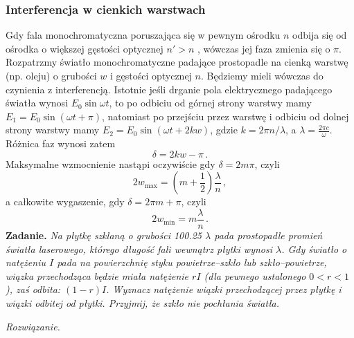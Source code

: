 \documentclass[../main.tex]{subfiles}
\begin{document}
\subsubsection{Interferencja w cienkich warstwach}
Gdy fala monochromatyczna poruszająca się w pewnym ośrodku \(n\) odbija się od ośrodka o większej
gęstości optycznej \(n'>n\) , wówczas jej faza zmienia się o \(\pi\). Rozpatrzmy światło
monochromatyczne padające prostopadle na cienką warstwę (np. oleju) o grubości \(w\) i gęstości
optycznej \(n\). Będziemy mieli wówczas do czynienia z interferencją. Istotnie jeśli drganie pola
elektrycznego padającego światła wynosi \(E_0\sin\omega t\), to po odbiciu od górnej strony warstwy
mamy \(E_1=E_0\sin(\omega t+\pi)\), natomiast po przejściu przez warstwę i odbiciu od dolnej strony
warstwy mamy \(E_2=E_0\sin(\omega t+2kw)\), gdzie \(k=2\pi n/\lambda\), a \(\lambda=\frac{2\pi
c}{\omega}\). Różnica faz wynosi zatem
\begin{equation*}
    \delta =2kw-\pi\,.
\end{equation*}
Maksymalne wzmocnienie nastąpi oczywiście gdy \(\delta =2m\pi\), czyli
\begin{equation*}
    2w_\text{max}=\left(m+\frac{1}{2}\right)\frac{\lambda}{n}\,,
\end{equation*}
a całkowite wygaszenie, gdy \(\delta=2\pi m+\pi\), czyli 
\begin{equation*}
    2w_\text{min}=m\frac{\lambda}{n}\,.
\end{equation*}
\textbf{Zadanie.} \textit{Na płytkę szklaną o grubości 100.25 \(\lambda\) pada prostopadle promień
światła laserowego, którego długość fali wewnątrz płytki wynosi \(\lambda\). Gdy światło o natężeniu
\(I\) pada na powierzchnię styku powietrze--szkło lub szkło--powietrze, wiązka przechodząca będzie
miała natężenie \(rI\) (dla pewnego ustalonego \(0<r<1\)), zaś odbita: \((1-r)I\). Wyznacz natężenie
wiązki przechodzącej przez płytkę i wiązki odbitej od płytki. Przyjmij, że szkło nie pochłania
światła.}
\medskip

\textit{Rozwiązanie.}
\medskip
\end{document}

